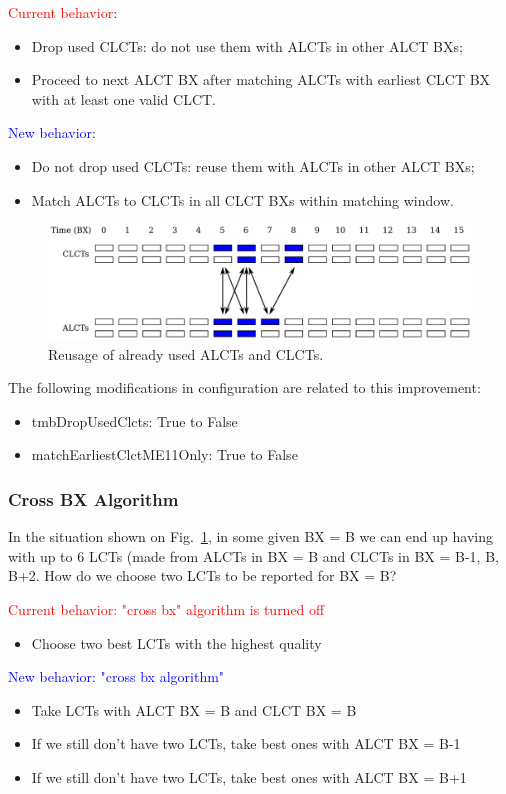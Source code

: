 \textcolor{red}{Current behavior}:
\begin{itemize}
    \item Drop used CLCTs: do not use them with ALCTs in other ALCT BXs;
    \item Proceed to next ALCT BX after matching ALCTs with earliest CLCT BX with at least one valid CLCT.
\end{itemize}
\textcolor{blue}{New behavior}:
\begin{itemize}
    \item Do not drop used CLCTs: reuse them with ALCTs in other ALCT BXs;
    \item Match ALCTs to CLCTs in all CLCT BXs within matching window.
\end{itemize}

\begin{figure}[tbh]
        \begin{center}
                \includegraphics[width=0.98\linewidth]{figures/clct_alcts_end_2.pdf}
                \caption{Reusage of already used ALCTs and CLCTs.}
                \label{fig:reuse_alct_clct}
        \end{center}
\end{figure}

The following modifications in configuration are related to this improvement:
\begin{itemize}
    \item tmbDropUsedClcts: True to False
    \item matchEarliestClctME11Only: True to False
\end{itemize}

\subsubsection{Cross BX Algorithm}

In the situation shown on Fig.~\ref{fig:reuse_alct_clct}, in some given BX = B we can end up having with up to 6 LCTs (made from ALCTs in BX = B and CLCTs in BX = B-1, B, B+2. How do we choose two LCTs to be reported for BX = B?

\textcolor{red}{Current behavior: "cross bx" algorithm is turned off}
\begin{itemize}
    \item Choose two best LCTs with the highest quality
\end{itemize}
\textcolor{blue}{New behavior: "cross bx algorithm"}
\begin{itemize}
    \item Take LCTs with ALCT BX = B and CLCT BX = B
    \item If we still don't have two LCTs, take best ones with ALCT BX = B-1
    \item If we still don't have two LCTs, take best ones with ALCT BX = B+1
\end{itemize}

